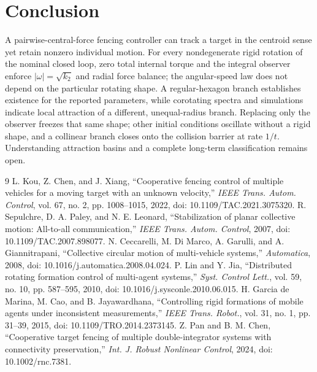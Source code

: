 \documentclass[conference]{IEEEtran}
\begin{document}
\section{Conclusion}
A pairwise-central-force fencing controller can track a target in the centroid sense yet retain nonzero individual motion. For every nondegenerate rigid rotation of the nominal closed loop, zero total internal torque and the integral observer enforce $|\omega|=\sqrt{k_2}$ and radial force balance; the angular-speed law does not depend on the particular rotating shape. A regular-hexagon branch establishes existence for the reported parameters, while corotating spectra and simulations indicate local attraction of a different, unequal-radius branch. Replacing only the observer freezes that same shape; other initial conditions oscillate without a rigid shape, and a collinear branch closes onto the collision barrier at rate $1/t$. Understanding attraction basins and a complete long-term classification remains open.

\begin{thebibliography}{9}
 L. Kou, Z. Chen, and J. Xiang, ``Cooperative fencing control of multiple vehicles for a moving target with an unknown velocity,'' \emph{IEEE Trans. Autom. Control}, vol. 67, no. 2, pp. 1008--1015, 2022, doi: 10.1109/TAC.2021.3075320.
 R. Sepulchre, D. A. Paley, and N. E. Leonard, ``Stabilization of planar collective motion: All-to-all communication,'' \emph{IEEE Trans. Autom. Control}, 2007, doi: 10.1109/TAC.2007.898077.
 N. Ceccarelli, M. Di Marco, A. Garulli, and A. Giannitrapani, ``Collective circular motion of multi-vehicle systems,'' \emph{Automatica}, 2008, doi: 10.1016/j.automatica.2008.04.024.
 P. Lin and Y. Jia, ``Distributed rotating formation control of multi-agent systems,'' \emph{Syst. Control Lett.}, vol. 59, no. 10, pp. 587--595, 2010, doi: 10.1016/j.sysconle.2010.06.015.
 H. Garcia de Marina, M. Cao, and B. Jayawardhana, ``Controlling rigid formations of mobile agents under inconsistent measurements,'' \emph{IEEE Trans. Robot.}, vol. 31, no. 1, pp. 31--39, 2015, doi: 10.1109/TRO.2014.2373145.
 Z. Pan and B. M. Chen, ``Cooperative target fencing of multiple double-integrator systems with connectivity preservation,'' \emph{Int. J. Robust Nonlinear Control}, 2024, doi: 10.1002/rnc.7381.
\end{thebibliography}
\end{document}
